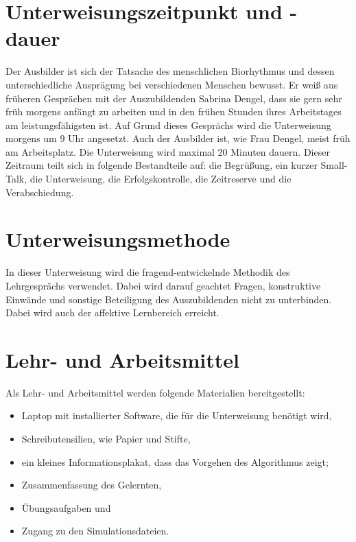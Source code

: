 \section{Unterweisungszeitpunkt und -dauer}
Der Ausbilder ist sich der Tatsache des menschlichen Biorhythmus und dessen unterschiedliche Ausprägung bei verschiedenen Menschen bewusst. Er weiß aus früheren Gesprächen mit der Auszubildenden Sabrina Dengel, dass sie gern sehr früh morgens anfängt zu arbeiten und in den frühen Stunden ihres Arbeitstages am leistungsfähigsten ist. Auf Grund dieses Gesprächs wird die Unterweisung morgens um 9 Uhr angesetzt. Auch der Ausbilder ist, wie Frau Dengel, meist früh am Arbeitsplatz. Die Unterweisung wird maximal 20 Minuten dauern. Dieser Zeitraum teilt sich in folgende Bestandteile auf: die Begrüßung, ein kurzer Small-Talk, die Unterweisung, die Erfolgskontrolle, die Zeitreserve und die Verabschiedung.   

\section{Unterweisungsmethode}
In dieser Unterweisung wird die fragend-entwickelnde Methodik des Lehrgesprächs verwendet. Dabei wird darauf geachtet Fragen, konstruktive Einwände und sonstige Beteiligung des Auszubildenden nicht zu unterbinden. Dabei wird auch der affektive Lernbereich erreicht. 

\section{Lehr- und Arbeitsmittel}
Als Lehr- und Arbeitsmittel werden folgende Materialien bereitgestellt: 
\begin{itemize}
	\item Laptop mit installierter Software, die für die Unterweisung benötigt wird,
	\item Schreibutensilien, wie Papier und Stifte, 
	\item ein kleines Informationsplakat, dass das Vorgehen des Algorithmus zeigt;
	\item Zusammenfassung des Gelernten,
	\item Übungsaufgaben und 
	\item Zugang zu den Simulationsdateien.
\end{itemize}


